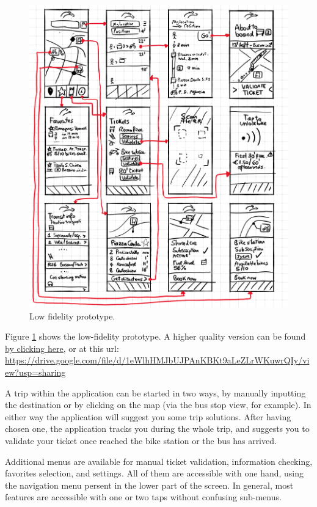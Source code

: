 \documentclass[11pt]{article}
\begin{document}
\begin{figure}[p]
    \centering
    \includegraphics[width=\textwidth]{drawable/lowfid/lowfid2}
    \caption{Low fidelity prototype.}
    \label{fig:lowfid}
\end{figure}

Figure \ref{fig:lowfid} shows the low-fidelity prototype. A higher quality version can be found \href{https://drive.google.com/file/d/1eWlhHMJbUJPAnKBKt9aLeZLrWKuwrQIy/view?usp=sharing}{by clicking here,} or at this url:\\\url{https://drive.google.com/file/d/1eWlhHMJbUJPAnKBKt9aLeZLrWKuwrQIy/view?usp=sharing}

A trip within the application can be started in two ways, by manually inputting the destination or by clicking on the map (via the bus stop view, for example). In either way the application will suggest you some trip solutions. After having chosen one, the application tracks you during the whole trip, and suggests you to validate your ticket once reached the bike station or the bus has arrived.

Additional menus are available for manual ticket validation, information checking, favorites selection, and settings. All of them are accessible with one hand, using the navigation menu persent in the lower part of the screen. In general, most features are accessible with one or two taps without confusing sub-menus.
\end{document}
